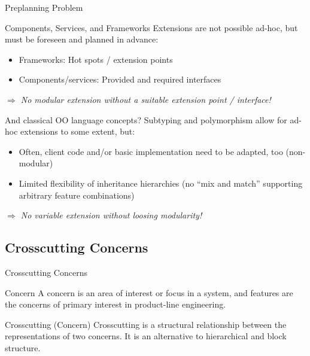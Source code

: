 \begin{frame}{Preplanning Problem}
	\begin{mycolumns}[widths={45,55},animation=none]
		\begin{note}{Components, Services, and Frameworks}
			Extensions are not possible ad-hoc, but must be foreseen and planned in advance:
			\begin{itemize}
				\item Frameworks: Hot spots / extension points
				\item Components/services: Provided and required interfaces 
			\end{itemize}
			\emph{$\Rightarrow$ No modular extension without a suitable extension point / interface!}
		\end{note}
	\mynextcolumn
		\begin{note}{And classical OO language concepts?}
			Subtyping and polymorphism allow for ad-hoc extensions to some extent, but:
			\begin{itemize}
				\item Often, client code and/or basic implementation need to be adapted, too (non-modular)
				\item Limited flexibility of inheritance hierarchies (no ``mix and match'' supporting arbitrary feature combinations)
			\end{itemize}
			\emph{$\Rightarrow$ No variable extension without loosing modularity!}
		\end{note}
	\end{mycolumns}
\end{frame}

\subsection{Crosscutting Concerns}

\begin{frame}{Crosscutting Concerns}
	\begin{mycolumns}[widths={50,50},animation=none]
		\begin{definition}{Concern }
			A concern is an area of interest or focus in a system, and features are the concerns of primary interest in product-line engineering.
		\end{definition}
	\mynextcolumn
		\begin{definition}{Crosscutting (Concern) }
			Crosscutting is a structural relationship between the representations of two concerns. 
			It is an alternative to hierarchical and block structure.
		\end{definition}
	\end{mycolumns}
\end{frame}

